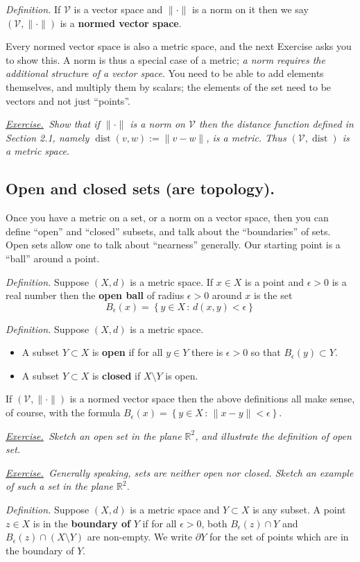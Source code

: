 \documentclass[12pt]{article}
\newcommand{\cV}{\mathcal{V}}
\newcommand{\RR}{\mathbb{R}}
\newcommand{\eps}{\epsilon}
\newcommand{\sect}[1]{\subsection*{#1.}}
\newcommand{\defin}{\emph{Definition.}\,\,}
\newcommand{\exer}[2]{\emph{\underline{Exercise.}\, #2} \vspace*{#1mm}}
\begin{document}
\defin If $\cV$ is a vector space and $\|\cdot\|$ is a norm on it then we say $(\cV,\|\cdot\|)$ is a \textbf{normed vector space}.

Every normed vector space is also a metric space, and the next Exercise asks you to show this.  A norm is thus a special case of a metric; \emph{a norm requires the additional structure of a vector space}.  You need to be able to add elements themselves, and multiply them by scalars; the elements of the set need to be vectors and not just ``points''.

\exer{30}{Show that if $\|\cdot\|$ is a norm on $\cV$ then the distance function defined in Section 2.1, namely $\operatorname{dist}(v,w) := \|v-w\|$, is a metric.  Thus $(\cV,\operatorname{dist})$ is a metric space.}


\sect{Open and closed sets (are topology)}

Once you have a metric on a set, or a norm on a vector space, then you can define ``open'' and ``closed'' subsets, and talk about the ``boundaries'' of sets.  Open sets allow one to talk about ``nearness'' generally.  Our starting point is a ``ball'' around a point.

\defin Suppose $(X,d)$ is a metric space.  If $x\in X$ is a point and $\eps>0$ is a real number then the \textbf{open ball} of radius $\eps>0$ around $x$ is the set
	$$B_\eps(x) = \left\{y\in X\,:\,d(x,y) < \eps\right\}$$ 

\defin Suppose $(X,d)$ is a metric space.
\begin{itemize}
\item A subset $Y\subset X$ is \textbf{open} if for all $y\in Y$ there is $\eps>0$ so that $B_\eps(y) \subset Y$.
\item A subset $Y\subset X$ is \textbf{closed} if $X \setminus Y$ is open.
\end{itemize}

If $(\cV,\|\cdot\|)$ is a normed vector space then the above definitions all make sense, of course, with the formula $B_\eps(x) = \left\{y\in X\,:\,\|x-y\|<\eps\right\}$.

\exer{50}{Sketch an open set in the plane $\RR^2$, and illustrate the definition of open set.}

\exer{50}{Generally speaking, sets are neither open nor closed.  Sketch an example of such a set in the plane $\RR^2$.}

\clearpage\newpage
\defin Suppose $(X,d)$ is a metric space and $Y \subset X$ is any subset.  A point $z\in X$ is in the \textbf{boundary of } $Y$ if for all $\eps>0$, both $B_\eps(z)\cap Y$ and $B_\eps(z)\cap (X\setminus Y)$ are non-empty.  We write $\partial Y$ for the set of points which are in the boundary of $Y$.
\end{document}

